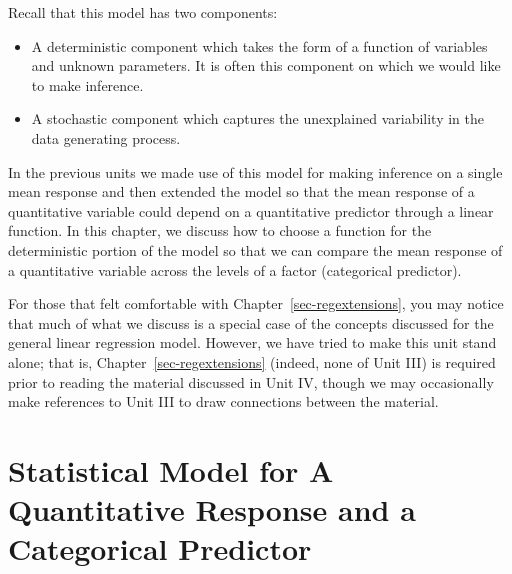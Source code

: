 \documentclass[
  letterpaper,
  DIV=11,
  numbers=noendperiod]{scrreprt}
\providecommand{\tightlist}{%
  \setlength{\itemsep}{0pt}\setlength{\parskip}{0pt}}\usepackage{longtable,booktabs,array}
\theoremstyle{definition}
\theoremstyle{definition}
\theoremstyle{plain}
\theoremstyle{remark}
\begin{document}
Recall that this model has two components:

\begin{itemize}
\tightlist
\item
  A deterministic component which takes the form of a function of
  variables and unknown parameters. It is often this component on which
  we would like to make inference.
\item
  A stochastic component which captures the unexplained variability in
  the data generating process.
\end{itemize}

In the previous units we made use of this model for making inference on
a single mean response and then extended the model so that the mean
response of a quantitative variable could depend on a quantitative
predictor through a linear function. In this chapter, we discuss how to
choose a function for the deterministic portion of the model so that we
can compare the mean response of a quantitative variable across the
levels of a factor (categorical predictor).

\begin{tcolorbox}[enhanced jigsaw, colbacktitle=quarto-callout-note-color!10!white, colback=white, left=2mm, title=\textcolor{quarto-callout-note-color}{\faInfo}\hspace{0.5em}{Note}, toptitle=1mm, leftrule=.75mm, breakable, bottomrule=.15mm, arc=.35mm, rightrule=.15mm, toprule=.15mm, coltitle=black, opacityback=0, colframe=quarto-callout-note-color-frame, opacitybacktitle=0.6, bottomtitle=1mm, titlerule=0mm]

For those that felt comfortable with Chapter~\ref{sec-regextensions},
you may notice that much of what we discuss is a special case of the
concepts discussed for the general linear regression model. However, we
have tried to make this unit stand alone; that is,
Chapter~\ref{sec-regextensions} (indeed, none of Unit III) is required
prior to reading the material discussed in Unit IV, though we may
occasionally make references to Unit III to draw connections between the
material.

\end{tcolorbox}

\section{Statistical Model for A Quantitative Response and a Categorical
Predictor}\label{statistical-model-for-a-quantitative-response-and-a-categorical-predictor}
\end{document}
